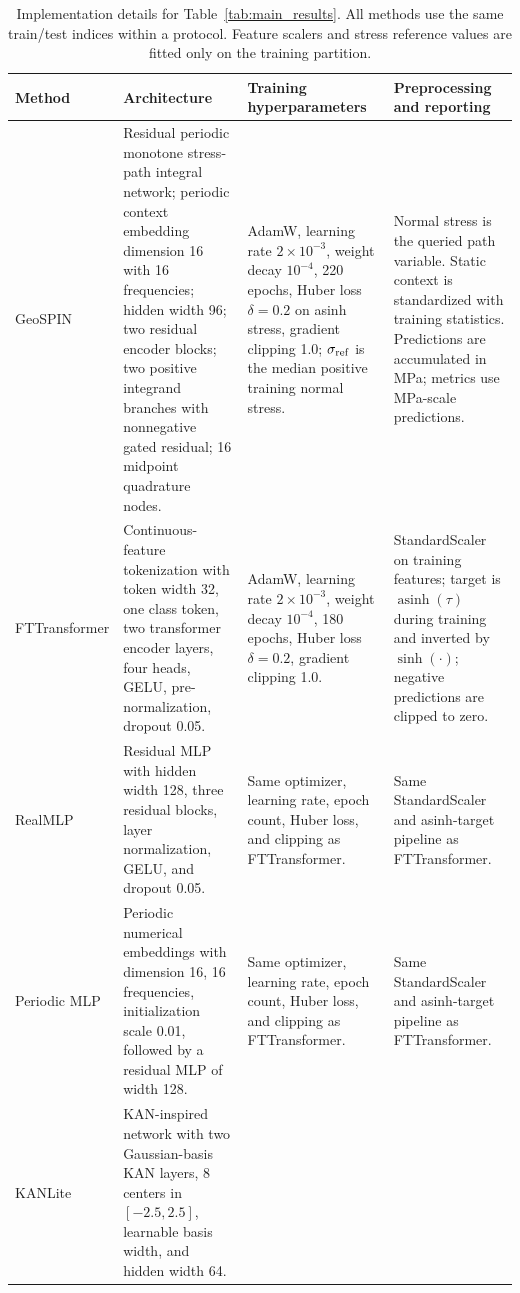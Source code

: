 \begin{table}[t]
\centering
\caption{Implementation details for Table~\ref{tab:main_results}. All methods use the same train/test indices within a protocol. Feature scalers and stress reference values are fitted only on the training partition.}
\label{tab:implementation}
\scriptsize
\setlength{\tabcolsep}{3.0pt}
\begin{tabular}{p{}p{}p{}p{}}
\toprule
Method & Architecture & Training hyperparameters & Preprocessing and reporting \\
\midrule
GeoSPIN &
Residual periodic monotone stress-path integral network; periodic context embedding dimension 16 with 16 frequencies; hidden width 96; two residual encoder blocks; two positive integrand branches with nonnegative gated residual; 16 midpoint quadrature nodes. &
AdamW, learning rate $2\times10^{-3}$, weight decay $10^{-4}$, 220 epochs, Huber loss $\delta=0.2$ on asinh stress, gradient clipping 1.0; $\sigma_{\rm ref}$ is the median positive training normal stress. &
Normal stress is the queried path variable. Static context is standardized with training statistics. Predictions are accumulated in MPa; metrics use MPa-scale predictions. \\
\midrule
FTTransformer &
Continuous-feature tokenization with token width 32, one class token, two transformer encoder layers, four heads, GELU, pre-normalization, dropout 0.05. &
AdamW, learning rate $2\times10^{-3}$, weight decay $10^{-4}$, 180 epochs, Huber loss $\delta=0.2$, gradient clipping 1.0. &
StandardScaler on training features; target is $\operatorname{asinh}(\tau)$ during training and inverted by $\sinh(\cdot)$; negative predictions are clipped to zero. \\
\midrule
RealMLP &
Residual MLP with hidden width 128, three residual blocks, layer normalization, GELU, and dropout 0.05. &
Same optimizer, learning rate, epoch count, Huber loss, and clipping as FTTransformer. &
Same StandardScaler and asinh-target pipeline as FTTransformer. \\
\midrule
Periodic MLP &
Periodic numerical embeddings with dimension 16, 16 frequencies, initialization scale 0.01, followed by a residual MLP of width 128. &
Same optimizer, learning rate, epoch count, Huber loss, and clipping as FTTransformer. &
Same StandardScaler and asinh-target pipeline as FTTransformer. \\
\midrule
KANLite &
KAN-inspired network with two Gaussian-basis KAN layers, 8 centers in $[-2.5,2.5]$, learnable basis width, and hidden width 64. &

\end{tabular}
\end{table}

